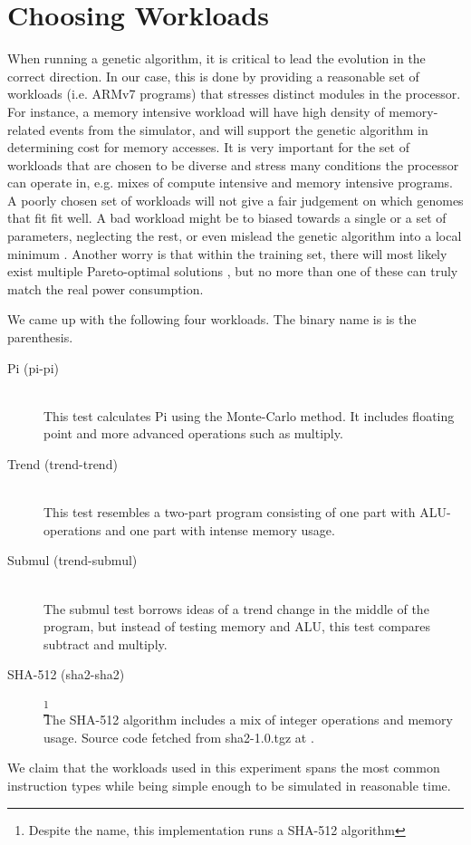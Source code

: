 \section{Choosing Workloads}
\label{sec:workloads}

When running a genetic algorithm, it is critical to lead the evolution in the
correct direction. In our case, this is done by providing a reasonable set of
workloads (i.e. ARMv7 programs) that stresses distinct modules in the processor.
For instance, a memory intensive workload will have high density of
memory-related events from the simulator, and will support the genetic algorithm
in determining cost for memory accesses. It is very important for the set of
workloads that are chosen to be diverse and stress many conditions the processor
can operate in, e.g. mixes of compute intensive and memory intensive programs.
A poorly chosen set of workloads will not give a fair judgement on which genomes
that fit fit well. A bad workload might be to biased towards a single or a set
of parameters, neglecting the rest, or even mislead the genetic algorithm into a
local minimum \cite{introtoga}. Another worry is that within the training set,
there will most likely exist multiple Pareto-optimal solutions
\cite{deb2014multi}, but no more than one of these can truly match the real
power consumption.

We came up with the following four workloads. The binary name is is the
parenthesis.

\begin{description}
    \item[Pi (pi-pi)] \hfill \\
        This test calculates Pi using the Monte-Carlo method. It includes
        floating point and more advanced operations such as multiply.
    \item[Trend (trend-trend)] \hfill \\
        This test resembles a two-part program consisting of
        one part with ALU-operations and one part with intense memory usage.
    \item[Submul (trend-submul)] \hfill \\
        The submul test borrows ideas of a trend change in the middle of
        the program, but instead of testing memory and ALU, this test compares
        subtract and multiply.
    \item[SHA-512 (sha2-sha2)]
        \footnote{Despite the name, this implementation runs a SHA-512
        algorithm} \hfill \\
        The SHA-512 algorithm includes a mix of integer operations and
        memory usage. Source code fetched from sha2-1.0.tgz at \cite{sha2}.
\end{description}

We claim that the workloads used in this experiment spans the most common
instruction types while being simple enough to be simulated in reasonable time.

